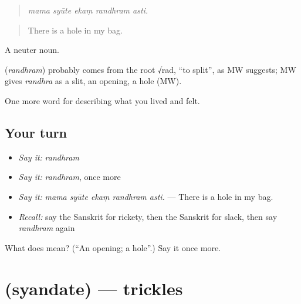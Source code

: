 \begin{quote}
    
\end{quote}

\begin{quote}
\emph{mama syūte ekaṃ randhram asti.}
\end{quote}

\begin{quote}
There is a hole in my bag.
\end{quote}

A neuter noun.

\begin{cousinweb}
\textbf{} (\emph{randhram}) probably comes from the root √rad, \textquotedblleft{}to split\textquotedblright{}, as MW suggests; MW gives \emph{randhra} as a slit, an opening, a hole (MW).
\end{cousinweb}

\begin{grammarlens}[title={What you've built}]
One more word for describing what you lived and felt.
\end{grammarlens}

\subsection*{Your turn}
\begin{itemize}
\raggedright
  \item \emph{Say it:} \emph{randhram}
  \item \emph{Say it:} \emph{randhram}, once more
  \item \emph{Say it:} \emph{mama syūte ekaṃ randhram asti.} — There is a hole in my bag.
  \item \emph{Recall:} say the Sanskrit for rickety, then the Sanskrit for slack, then say \emph{randhram} again
\end{itemize}

\begin{tcolorbox}[breakable,colback=teal!4,colframe=teal!35!black,title={Before you move on}]
What does  mean? (\textquotedblleft{}An opening; a hole\textquotedblright{}.) Say it once more.
\end{tcolorbox}
\section[\texorpdfstring{\sk{स्यन्दते} (syandate)}{स्यन्दते (syandate)}]{ (syandate) — trickles}

